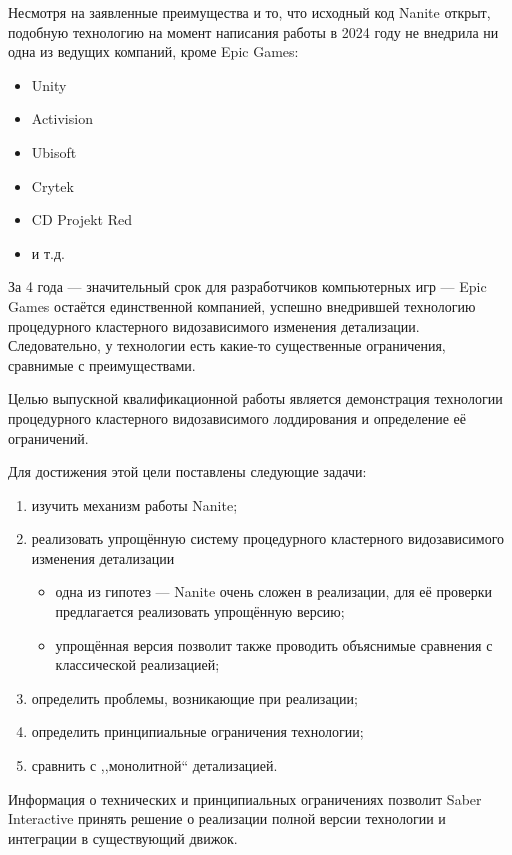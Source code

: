 Несмотря на заявленные преимущества и то, что исходный код Nanite открыт, подобную технологию на момент написания работы в 2024 году не внедрила ни одна из ведущих компаний, кроме Epic Games:
\begin{itemize}
    \item Unity
    \item Activision
    \item Ubisoft
    \item Crytek
    \item CD Projekt Red
    \item и т.д.
\end{itemize}
За 4 года --- значительный срок для разработчиков компьютерных игр --- Epic Games остаётся единственной компанией, успешно внедрившей технологию процедурного кластерного видозависимого изменения детализации.
Следовательно, у технологии есть какие-то существенные ограничения, сравнимые с преимуществами.

Целью выпускной квалификационной работы является демонстрация технологии процедурного кластерного видозависимого лоддирования и определение её ограничений.

Для достижения этой цели поставлены следующие задачи:
\begin{enumerate}
    \item изучить механизм работы Nanite;
    \item реализовать упрощённую систему процедурного кластерного видозависимого изменения детализации
    \begin{itemize}
        \item одна из гипотез --- Nanite очень сложен в реализации, для её проверки предлагается реализовать упрощённую версию;
        \item упрощённая версия позволит также проводить объяснимые сравнения с классической реализацией;
    \end{itemize}
    \item определить проблемы, возникающие при реализации;
    \item определить принципиальные ограничения технологии;
    \item сравнить с ,,монолитной`` детализацией.
\end{enumerate}

Информация о технических и принципиальных ограничениях позволит Saber Interactive принять решение о реализации полной версии технологии и интеграции в существующий движок.

